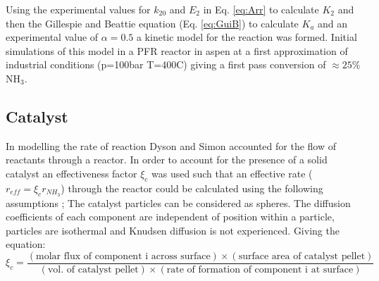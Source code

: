 \documentclass[11pt, a4paper]{article}
\begin{document}
{Using the experimental values for $k_{20}$ and $E_2$ in Eq. \ref{eq:Arr} to calculate $K_2$ and then the Gillespie and Beattie equation (Eq. \ref{eq:GuiB}) to calculate $K_a$ and an experimental value of $\alpha = 0.5$ a kinetic model for the reaction was formed. Initial simulations of this model in a PFR reactor in aspen at a first approximation of industrial conditions (p=100bar T=400\textdegree C) giving a first pass conversion of $\approx25\% $ NH$_3$.

\subsection{Catalyst}

In modelling the rate of reaction Dyson and Simon accounted for the flow of reactants through a reactor. In order to account for the presence of a solid catalyst an effectiveness factor $\xi_{c}$ was used such that an effective rate ($r_{eff}=\xi_{c}r_{NH_3}$) through the reactor could be calculated using the following assumptions \cite{Dyson1968}; The catalyst particles can be considered as spheres. The diffusion coefficients of each component are independent of position within a particle, particles are isothermal and Knudsen diffusion is not experienced. Giving the equation:
\begin{equation}
	\xi_{c} = \frac{(\text{molar flux of component i across surface})\times(\text{surface area of catalyst pellet})}{(\text{vol. of catalyst pellet})\times(\text{rate of formation of component i at surface})}
\end{equation}

}
\end{document}
